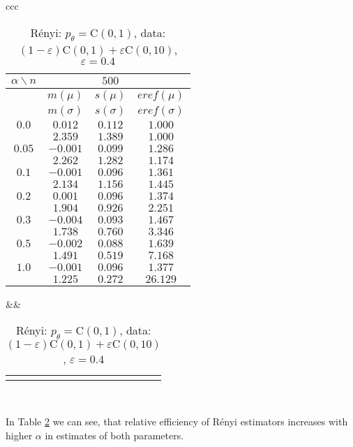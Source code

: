 {\begin{table}[htb] \footnotesize
\begin{center}
\begin{tabular}{ccc}
	\begin{tabular}{|c|ccc|} 
	\hline 
	$\alpha\backslash n$ && $500$ & \\ 
	\hline 
	& $m(\mu)$ & $s(\mu)$ & $eref(\mu)$ \\ 
	& $m(\sigma)$ & $s(\sigma)$ & $eref(\sigma)$ \\ 
	\hline 
	$0.0$ & $ 0.012 $ & $ 0.112 $ & $ 1.000 $\\ 
	 & $ 2.359 $ & $ 1.389 $ & $ 1.000 $\\ 
	\hline 
	$0.05$ & $ -0.001 $ & $ 0.099 $ & $ 1.286 $\\ 
	 & $ 2.262 $ & $ 1.282 $ & $ 1.174 $\\ 
	\hline 
	$0.1$ & $ -0.001 $ & $ 0.096 $ & $ 1.361 $\\ 
	 & $ 2.134 $ & $ 1.156 $ & $ 1.445 $\\ 
	\hline 
	$0.2$ & $ 0.001 $ & $ 0.096 $ & $ 1.374 $\\ 
	 & $ 1.904 $ & $ 0.926 $ & $ 2.251 $\\ 
	\hline 
	$0.3$ & $ -0.004 $ & $ 0.093 $ & $ 1.467 $\\ 
	 & $ 1.738 $ & $ 0.760 $ & $ 3.346 $\\ 
	\hline 
	$0.5$ & $ -0.002 $ & $ 0.088 $ & $ 1.639 $\\ 
	 & $ 1.491 $ & $ 0.519 $ & $ 7.168 $\\ 
	\hline 
	$1.0$ & $ -0.001 $ & $ 0.096 $ & $ 1.377 $\\ 
	 & $ 1.225 $ & $ 0.272 $ & $ 26.129 $\\ 
	\hline 
	\end{tabular}
&&
	\begin{tabular}{c}
		\epsfig{file=Cauchy-e04-eref.eps, height=2in} 
	\end{tabular}
\\
\end{tabular}
\end{center}
\caption{R\'{e}nyi: $p_\theta = \mathrm{C}(0,1)$, data: $(1-\varepsilon)\mathrm{C}(0,1) + \varepsilon \mathrm{C}(0,10)$, $\varepsilon =  0.4$} 
\label{tabJK:cauchy-eref}
\end{table}

In Table \ref{tabJK:cauchy-eref} we can see, that relative efficiency of R\'{e}nyi estimators increases with higher $\alpha$ in estimates of both parameters.


}
